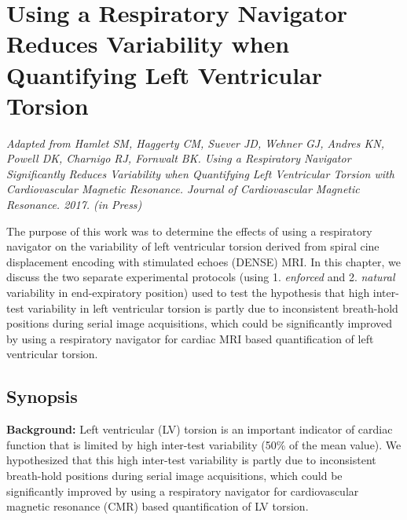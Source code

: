 \chapter{Using a Respiratory Navigator Reduces Variability when Quantifying Left Ventricular Torsion}

\begin{center}
\textit{Adapted from Hamlet SM, Haggerty CM, Suever JD, Wehner GJ, Andres KN, Powell DK, Charnigo RJ, Fornwalt BK. Using a Respiratory Navigator Significantly Reduces Variability when Quantifying Left Ventricular Torsion with Cardiovascular Magnetic Resonance. Journal of Cardiovascular Magnetic Resonance. 2017. (in Press)}
\end{center}

The purpose of this work was to determine the effects of using a respiratory navigator on the variability of left ventricular torsion derived from spiral cine displacement encoding with stimulated echoes (DENSE) MRI. In this chapter, we discuss the two separate experimental protocols (using 1. \textit{enforced} and 2. \textit{natural} variability in end-expiratory position) used to test the hypothesis that high inter-test variability in left ventricular torsion is partly due to inconsistent breath-hold positions during serial image acquisitions, which could be significantly improved by using a respiratory navigator for cardiac MRI based quantification of left ventricular torsion.

\section{Synopsis}
	\noindent \textbf{Background:} Left ventricular (LV) torsion is an important indicator of cardiac function that is limited by high inter-test variability (50\% of the mean value). We hypothesized that this high inter-test variability is partly due to inconsistent breath-hold positions during serial image acquisitions, which could be significantly improved by using a respiratory navigator for cardiovascular magnetic resonance (CMR) based quantification of LV torsion.
	
